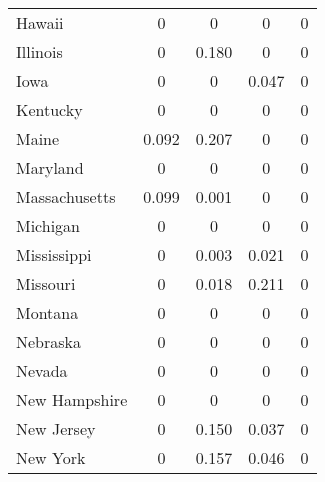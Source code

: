 \documentclass[../Main.tex]{subfiles}
\begin{document}
\begin{table}[htbp]
\begin{tabular}{@{\extracolsep{4pt}}l*{8}{c}}
\multicolumn{1}{l}{Hawaii} & \multicolumn{2}{c}{0} & \multicolumn{2}{c}{0} & \multicolumn{2}{c}{0} & \multicolumn{2}{c}{0}\\
\multicolumn{1}{l}{Illinois} & \multicolumn{2}{c}{0} & \multicolumn{2}{c}{0.180} & \multicolumn{2}{c}{0} & \multicolumn{2}{c}{0}\\
\multicolumn{1}{l}{Iowa} & \multicolumn{2}{c}{0} & \multicolumn{2}{c}{0} & \multicolumn{2}{c}{0.047} & \multicolumn{2}{c}{0}\\
\multicolumn{1}{l}{Kentucky} & \multicolumn{2}{c}{0} & \multicolumn{2}{c}{0} & \multicolumn{2}{c}{0} & \multicolumn{2}{c}{0}\\
\multicolumn{1}{l}{Maine} & \multicolumn{2}{c}{0.092} & \multicolumn{2}{c}{0.207} & \multicolumn{2}{c}{0} & \multicolumn{2}{c}{0}\\
\multicolumn{1}{l}{Maryland} & \multicolumn{2}{c}{0} & \multicolumn{2}{c}{0} & \multicolumn{2}{c}{0} & \multicolumn{2}{c}{0}\\
\multicolumn{1}{l}{Massachusetts} & \multicolumn{2}{c}{0.099} & \multicolumn{2}{c}{0.001} & \multicolumn{2}{c}{0} & \multicolumn{2}{c}{0}\\
\multicolumn{1}{l}{Michigan} & \multicolumn{2}{c}{0} & \multicolumn{2}{c}{0} & \multicolumn{2}{c}{0} & \multicolumn{2}{c}{0}\\
\multicolumn{1}{l}{Mississippi} & \multicolumn{2}{c}{0} & \multicolumn{2}{c}{0.003} & \multicolumn{2}{c}{0.021} & \multicolumn{2}{c}{0}\\
\multicolumn{1}{l}{Missouri} & \multicolumn{2}{c}{0} & \multicolumn{2}{c}{0.018} & \multicolumn{2}{c}{0.211} & \multicolumn{2}{c}{0}\\
\multicolumn{1}{l}{Montana} & \multicolumn{2}{c}{0} & \multicolumn{2}{c}{0} & \multicolumn{2}{c}{0} & \multicolumn{2}{c}{0}\\
\multicolumn{1}{l}{Nebraska} & \multicolumn{2}{c}{0} & \multicolumn{2}{c}{0} & \multicolumn{2}{c}{0} & \multicolumn{2}{c}{0}\\
\multicolumn{1}{l}{Nevada} & \multicolumn{2}{c}{0} & \multicolumn{2}{c}{0} & \multicolumn{2}{c}{0} & \multicolumn{2}{c}{0}\\
\multicolumn{1}{l}{New Hampshire} & \multicolumn{2}{c}{0} & \multicolumn{2}{c}{0} & \multicolumn{2}{c}{0} & \multicolumn{2}{c}{0}\\
\multicolumn{1}{l}{New Jersey} & \multicolumn{2}{c}{0} & \multicolumn{2}{c}{0.150} & \multicolumn{2}{c}{0.037} & \multicolumn{2}{c}{0}\\
\multicolumn{1}{l}{New York} & \multicolumn{2}{c}{0} & \multicolumn{2}{c}{0.157} & \multicolumn{2}{c}{0.046} & \multicolumn{2}{c}{0}\\

\end{tabular}
\end{table}
\end{document}

